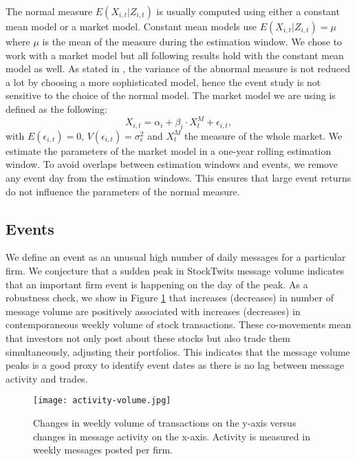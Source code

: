The normal measure $E(X_{i,t}|Z_{i,t})$ is usually computed using either a constant mean model or a market model. Constant mean models use $E(X_{i,t}|Z_{i,t}) = \mu$ where $\mu$ is the mean of the measure during the estimation window. We chose to work with a market model but all following results hold with the constant mean model as well. As stated in \citet{mackinlay1997event}, the variance of the abnormal measure is not reduced a lot by choosing a more sophisticated model, hence the event study is not sensitive to the choice of the normal model. 
The market model we are using is defined as the following: 
\begin{equation*}\label{eq_mm}
    X_{i,t} = \alpha_i + \beta_i \cdot X_{t}^M + \epsilon_{i,t},
\end{equation*}
with $E(\epsilon_{i,t}) = 0$, $V(\epsilon_{i,t}) = \sigma_{\epsilon}^2$ and $X_{t}^M$ the measure of the whole market. We estimate the parameters of the market model in a one-year rolling estimation window. To avoid overlaps between estimation windows and events, we remove any event day from the estimation windows. This ensures that large event returns do not influence the parameters of the normal measure.

\subsection{Events}
We define an event as an unusual high number of daily messages for a particular firm. We conjecture that a sudden peak in StockTwits message volume indicates that an important firm event is happening on the day of the peak. As a robustness check, we show in Figure \ref{fig:actvol} that increases (decreases) in number of message volume are positively associated with increases (decreases) in contemporaneous weekly volume of stock transactions. These co-movements mean that investors not only post about these stocks but also trade them simultaneously, adjusting their portfolios. This indicates that the message volume peaks is a good proxy to identify event dates as there is no lag between message activity and trades.

\begin{figure}
    \centering
    \texttt{[image: activity-volume.jpg]}
    \caption{Changes in weekly volume of transactions on the y-axis versus changes in message activity on the x-axis. Activity is measured in weekly messages posted per firm.}
    \label{fig:actvol}
\end{figure}

